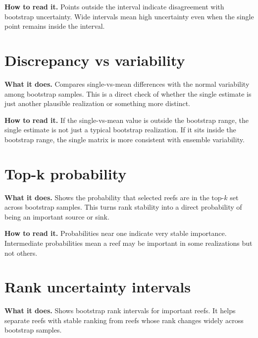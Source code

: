 \documentclass[11pt,a4paper]{article}
\begin{document}
\textbf{How to read it.} Points outside the interval indicate disagreement with bootstrap uncertainty.
Wide intervals mean high uncertainty even when the single point remains inside the interval.

\section{Discrepancy vs variability}

\textbf{What it does.} Compares single-vs-mean differences with the normal variability among bootstrap samples.
This is a direct check of whether the single estimate is just another plausible realization or something more distinct.


\textbf{How to read it.} If the single-vs-mean value is outside the bootstrap range, the single estimate is not just a typical bootstrap realization.
If it sits inside the bootstrap range, the single matrix is more consistent with ensemble variability.

\section{Top-k probability}

\textbf{What it does.} Shows the probability that selected reefs are in the top-\(k\) set across bootstrap samples.
This turns rank stability into a direct probability of being an important source or sink.


\textbf{How to read it.} Probabilities near one indicate very stable importance.
Intermediate probabilities mean a reef may be important in some realizations but not others.

\section{Rank uncertainty intervals}

\textbf{What it does.} Shows bootstrap rank intervals for important reefs.
It helps separate reefs with stable ranking from reefs whose rank changes widely across bootstrap samples.

\end{document}
